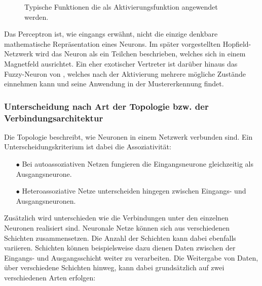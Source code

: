 \begin{figure}[!htb]
    \centering
    
    
    \caption{Typische Funktionen die als Aktivierungsfunktion angewendet werden.\protect\footnotemark{}}
    \label{fig:funktion}
\end{figure}
\addtocounter{footnote}{-1}     %
\addtocounter{Hfootnote}{-1}    %
\wrapfigfoot{}

Das Perceptron ist, wie eingangs erwähnt, nicht die einzige denkbare mathematische Repräsentation eines Neurons. Im später vorgestellten Hopfield-Netzwerk wird das Neuron als ein Teilchen beschrieben, welches sich in einem Magnetfeld ausrichtet. Ein eher exotischer Vertreter ist darüber hinaus das Fuzzy-Neuron von \citet{fuzzy-neuron}, welches nach der Aktivierung mehrere mögliche Zustände einnehmen kann und seine Anwendung in der Mustererkennung findet. 



\subsubsection{Unterscheidung nach Art der Topologie bzw. der Verbindungsarchitektur}

Die Topologie beschreibt, wie Neuronen in einem Netzwerk verbunden sind. Ein Unterscheidungskriterium ist dabei die Assoziativität:
\begin{itemize}
\item[\textbf{$\bullet$}] Bei autoassoziativen Netzen fungieren die Eingangsneurone gleichzeitig als Ausgangsneurone.

\item[\textbf{$\bullet$}] Heteroassoziative Netze unterscheiden hingegen zwischen Eingangs- und Ausgangsneuronen.
\end{itemize}

Zusätzlich wird unterschieden wie die Verbindungen unter den einzelnen Neuronen realisiert sind. Neuronale Netze können sich aus verschiedenen Schichten zusammensetzen. Die Anzahl der Schichten kann dabei ebenfalls variieren. Schichten können beispielsweise dazu dienen Daten zwischen der Eingangs- und Ausgangsschicht weiter zu verarbeiten. Die Weitergabe von Daten, über verschiedene Schichten hinweg, kann dabei grundsätzlich auf zwei verschiedenen Arten erfolgen:\,

